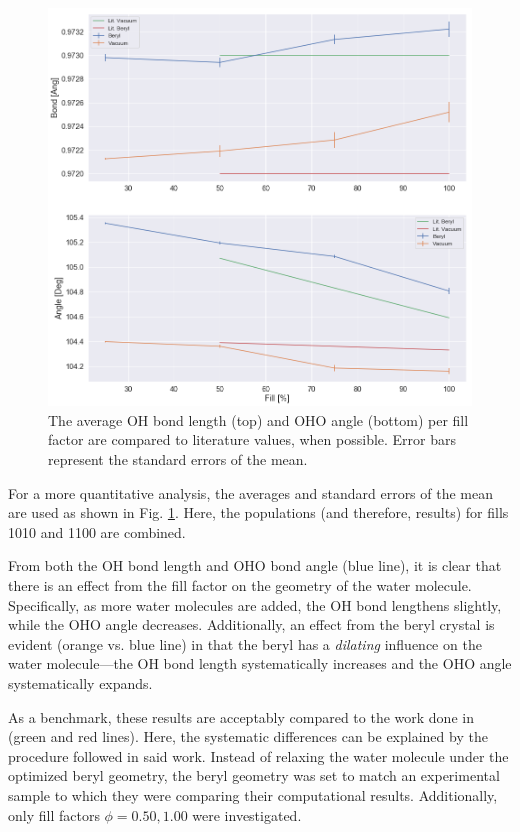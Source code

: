         \begin{figure}
            \centering
            \includegraphics[width=0.85\linewidth]{Figures/System/geom_results.png}
            \caption{The average OH bond length (top) and OHO angle (bottom) per fill factor are compared to literature values, when possible. Error bars represent the standard errors of the mean.}
            \label{fig:geom_results}
        \end{figure}
        
        For a more quantitative analysis, the averages and standard errors of the mean are used as shown in Fig. \ref{fig:geom_results}. Here, the populations (and therefore, results) for fills 1010 and 1100 are combined. 
        
        From both the OH bond length and OHO bond angle (blue line), it is clear that there is an effect from the fill factor on the geometry of the water molecule. Specifically, as more water molecules are added, the OH bond lengthens slightly, while the OHO angle decreases. Additionally, an effect from the beryl crystal is evident (orange vs. blue line) in that the beryl has a \textit{dilating} influence on the water molecule---the OH bond length systematically increases and the OHO angle systematically expands. 
        
        As a benchmark, these results are acceptably compared to the work done in \cite{vibr_states} (green and red lines). Here, the systematic differences can be explained by the procedure followed in said work. Instead of relaxing the water molecule under the optimized beryl geometry, the beryl geometry was set to match an experimental sample to which they were comparing their computational results. Additionally, only fill factors $\phi = 0.50, 1.00$ were investigated. 
        
